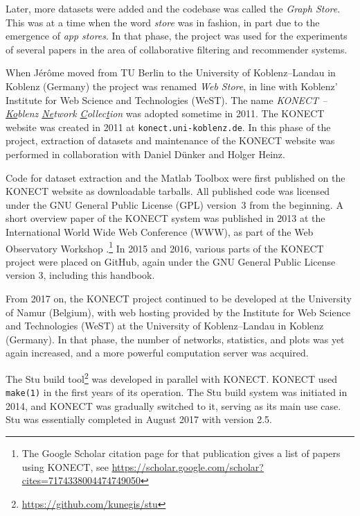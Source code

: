 \documentclass{article}
\begin{document}
Later, more datasets
were added and the codebase was called the \emph{Graph Store}.  This was
at a time when the word \emph{store} was in fashion, in part due to the
emergence of \emph{app stores}. 
In that phase, the project was used for the experiments of several papers in the area of
collaborative filtering and recommender systems.  

When Jérôme moved from
TU Berlin to the University of Koblenz--Landau in Koblenz (Germany) the
project was renamed \emph{Web Store}, in line with Koblenz' Institute
for Web Science and Technologies (WeST).  The name \emph{KONECT --
  \underline{Ko}blenz \underline{Ne}twork
  \underline{C}ollec\underline{t}ion} was adopted sometime in 2011.  The
KONECT website was created in 2011 at \texttt{konect.uni-koblenz.de}.
In this phase of the project, extraction of datasets and maintenance of the
KONECT website was performed in collaboration with Daniel Dünker and
Holger Heinz. 

Code for dataset extraction and the Matlab Toolbox were first published
on the KONECT website as downloadable tarballs.  All published code was
licensed under the GNU General Public License (GPL) version~3 from the beginning. 
A short overview paper of the KONECT system was
published in 2013 at the International World Wide Web Conference (WWW),
as part of the Web Observatory Workshop \citep{kunegis:konect}.\footnote{
  The Google Scholar citation page for that publication gives a list of papers using KONECT, see \href{https://scholar.google.com/scholar?cites=7174338004474749050}{https://scholar.google.com/scholar?cites=7174338004474749050}}
In 2015 and 2016, various parts of the KONECT project were placed on
GitHub, again under the GNU
General Public License version 3, including this handbook.  

From 2017 on, the KONECT project continued to be developed at the University of
Namur (Belgium), with web hosting provided by the Institute for Web
Science and Technologies (WeST) at the University of
Koblenz--Landau in Koblenz (Germany).  In that phase, the number of
networks, statistics, and plots was yet again increased, and a more
powerful computation server was acquired. 

The Stu build
tool\footnote{\href{https://github.com/kunegis/stu}{https://github.com/kunegis/stu}}
was developed in parallel with KONECT.  KONECT used \texttt{make(1)} in
the first years of its operation.  The Stu build system was initiated in
2014, and KONECT was gradually switched to it, serving as its main use
case.  Stu was essentially completed in August 2017 with version 2.5. 
\end{document}

